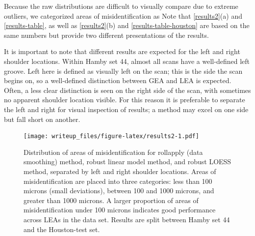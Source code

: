 \documentclass[12pt]{article}
\begin{document}
Because the raw distributions are difficult to visually compare due to
extreme outliers, we categorized areas of misidentification as
{}
Note that \autoref{results2}(a) and \autoref{results-table}, as well as
\autoref{results2}(b) and \autoref{results-table-houston} are based on
the same numbers but provide two different presentations of the results.

It is important to note that different results are expected for the left
and right shoulder locations. Within Hamby set 44, almost all scans have
a well-defined left groove. Left here is defined as visually left on the
scan; this is the side the scan begins on, so a well-defined distinction
between GEA and LEA is expected. Often, a less clear distinction is seen
on the right side of the scan, with sometimes no apparent shoulder
location visible.
{\color{teal}{This may be due to the left shoulder corresponding to the leading edge in the twist of a bullet as it is propelled through a gun barrel.}}
For this reason it is preferable to separate the left and right for
visual inspection of results; a method may excel on one side but fall
short on another.

\begin{figure}
\centering
\texttt{[image: writeup\_files/figure-latex/results2-1.pdf]}
\caption{\label{results2}Distribution of areas of misidentification for
rollapply (data smoothing) method, robust linear model method, and
robust LOESS method, separated by left and right shoulder locations.
Areas of misidentification are placed into three categories: less than
100 microns (small deviations), between 100 and 1000 microns, and
greater than 1000 microns. A larger proportion of areas of
misidentification under 100 microns indicates good performance across
LEAs in the data set. Results are split between Hamby set 44 and the
Houston-test set.}
\end{figure}
\end{document}
